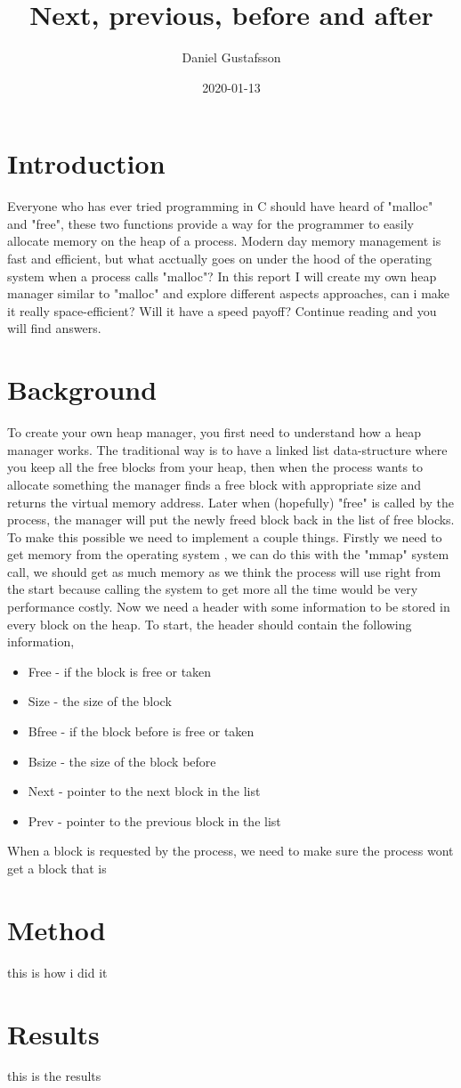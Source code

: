 \documentclass[11pt]{article}
\title{Next, previous, before and after}
\date{2020-01-13}
\author{Daniel Gustafsson}
\begin{document}
\maketitle
{}

\newpage
{}

\section{Introduction}

Everyone who has ever tried programming in C should have heard of "malloc" and "free", these two functions provide a way for the programmer to easily
allocate memory on the heap of a process. Modern day memory management is fast and efficient, but what acctually goes on under the hood of the
operating system when a process calls "malloc"? In this report I will create my own heap manager similar to "malloc" and explore different aspects 
approaches, can i make it really space-efficient? Will it have a speed payoff? Continue reading and you will find answers.

\section{Background}

To create your own heap manager, you first need to understand how a heap manager works. The traditional way is to have a linked list data-structure 
where you keep all the free blocks from your heap, then when the process wants to allocate something the manager finds a free block with appropriate
size and returns the virtual memory address. Later when (hopefully) "free" is called by the process, the manager will put the newly freed block 
back in the list of free blocks. To make this possible we need to implement a couple things. Firstly we need to get memory from the operating system
, we can do this with the "mmap" system call, we should get as much memory as we think the process will use right from the start because 
calling the system to get more all the time would be very performance costly. Now we need a header with some information to be stored in every block
on the heap. To start, the header should contain the following information,
\begin{itemize}
    \item Free - if the block is free or taken
    \item Size - the size of the block
    \item Bfree - if the block before is free or taken
    \item Bsize - the size of the block before
    \item Next - pointer to the next block in the list
    \item Prev - pointer to the previous block in the list
\end{itemize}

When a block is requested by the process, we need to make sure the process wont get a block that is 

\section{Method}

this is how i did it

\section{Results}

this is the results
\end{document}
